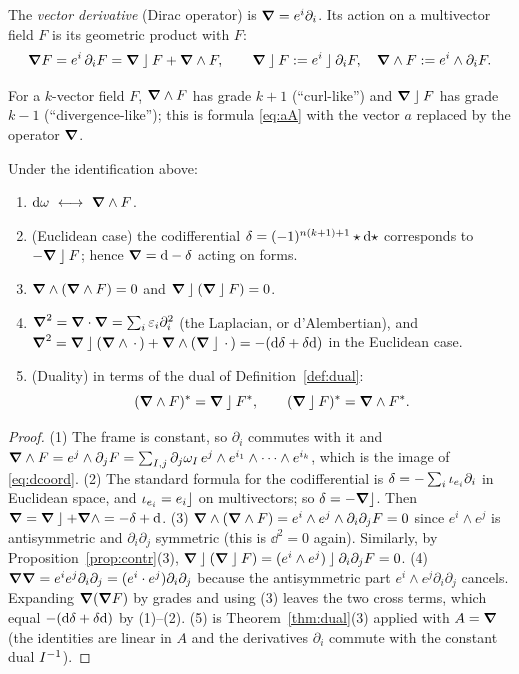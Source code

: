 \begin{definition}
The \emph{vector derivative} (Dirac operator) is $\boldsymbol{\nabla}=e^i\partial_i$. Its action on a multivector field $F$ is its geometric product with $F$:
\[
 \boldsymbol{\nabla} F=e^i\,\partial_iF=\boldsymbol{\nabla}\mathbin{\rfloor} F+\boldsymbol{\nabla}\wedge F,\qquad \boldsymbol{\nabla}\mathbin{\rfloor} F:=e^i\mathbin{\rfloor}\partial_iF,\quad \boldsymbol{\nabla}\wedge F:=e^i\wedge\partial_iF .
\]
\end{definition}

For a $k$-vector field $F$, $\boldsymbol{\nabla}\wedge F$ has grade $k+1$ (``curl-like'') and $\boldsymbol{\nabla}\mathbin{\rfloor} F$ has grade $k-1$ (``divergence-like''); this is formula \eqref{eq:aA} with the vector $a$ replaced by the operator $\boldsymbol{\nabla}$.

\begin{theorem}[$\dd$ is $\vd\wedge$]\label{thm:dGA}
Under the identification above:
\begin{enumerate}
  \item $\dd\omega\ \longleftrightarrow\ \vd\wedge F$.
  \item (Euclidean case) the codifferential $\delta=(-1)^{n(k+1)+1}\star\mathrm{d}\star$ corresponds to $-\boldsymbol{\nabla}\mathbin{\rfloor} F$; hence $\boldsymbol{\nabla}=\mathrm{d}-\delta$ acting on forms.
  \item $\boldsymbol{\nabla}\wedge(\boldsymbol{\nabla}\wedge F)=0$ and $\boldsymbol{\nabla}\mathbin{\rfloor}(\boldsymbol{\nabla}\mathbin{\rfloor} F)=0$.
  \item $\boldsymbol{\nabla}^2=\boldsymbol{\nabla}\cdot\boldsymbol{\nabla}=\sum_i\varepsilon_i\partial_i^2$ (the Laplacian, or d'Alembertian), and $\boldsymbol{\nabla}^2=\boldsymbol{\nabla}\mathbin{\rfloor}(\boldsymbol{\nabla}\wedge\,\cdot\,)+\boldsymbol{\nabla}\wedge(\boldsymbol{\nabla}\mathbin{\rfloor}\,\cdot\,)=-(\mathrm{d}\delta+\delta\mathrm{d})$ in the Euclidean case.
  \item (Duality) in terms of the dual of Definition~\ref{def:dual}:
  \[
   (\boldsymbol{\nabla}\wedge F)^{\ast}=\boldsymbol{\nabla}\mathbin{\rfloor}F^{\ast},\qquad (\boldsymbol{\nabla}\mathbin{\rfloor} F)^{\ast}=\boldsymbol{\nabla}\wedge F^{\ast} .
  \]
\end{enumerate}
\end{theorem}
\begin{proof}
(1) The frame is constant, so $\partial_i$ commutes with it and
$\boldsymbol{\nabla}\wedge F=e^j\wedge\partial_jF=\sum_{I,j}\partial_j\omega_I\,e^j\wedge e^{i_1}\wedge\cdots\wedge e^{i_k}$, which is the image of \eqref{eq:dcoord}.
(2) The standard formula for the codifferential is $\delta=-\sum_i\iota_{e_i}\partial_{i}$ in Euclidean space, and $\iota_{e_i}=e_i\mathbin{\rfloor}$ on multivectors; so $\delta=-\boldsymbol{\nabla}\mathbin{\rfloor}$. Then $\boldsymbol{\nabla}=\boldsymbol{\nabla}\mathbin{\rfloor}+\boldsymbol{\nabla}\wedge=-\delta+\mathrm{d}$.
(3) $\boldsymbol{\nabla}\wedge(\boldsymbol{\nabla}\wedge F)=e^i\wedge e^j\wedge\partial_i\partial_jF=0$ since $e^i\wedge e^j$ is antisymmetric and $\partial_i\partial_j$ symmetric (this is $\dd^2=0$ again). Similarly, by Proposition~\ref{prop:contr}(3), $\boldsymbol{\nabla}\mathbin{\rfloor}(\boldsymbol{\nabla}\mathbin{\rfloor} F)=(e^i\wedge e^j)\mathbin{\rfloor}\partial_i\partial_jF=0$.
(4) $\boldsymbol{\nabla}\boldsymbol{\nabla}=e^ie^j\partial_i\partial_j=(e^i\cdot e^j)\partial_i\partial_j$ because the antisymmetric part $e^i\wedge e^j\partial_i\partial_j$ cancels. Expanding $\boldsymbol{\nabla}(\boldsymbol{\nabla} F)$ by grades and using (3) leaves the two cross terms, which equal $-(\mathrm{d}\delta+\delta\mathrm{d})$ by (1)--(2).
(5) is Theorem~\ref{thm:dual}(3) applied with $A=\boldsymbol{\nabla}$ (the identities are linear in $A$ and the derivatives $\partial_i$ commute with the constant dual $I^{-1}$).
\end{proof}

